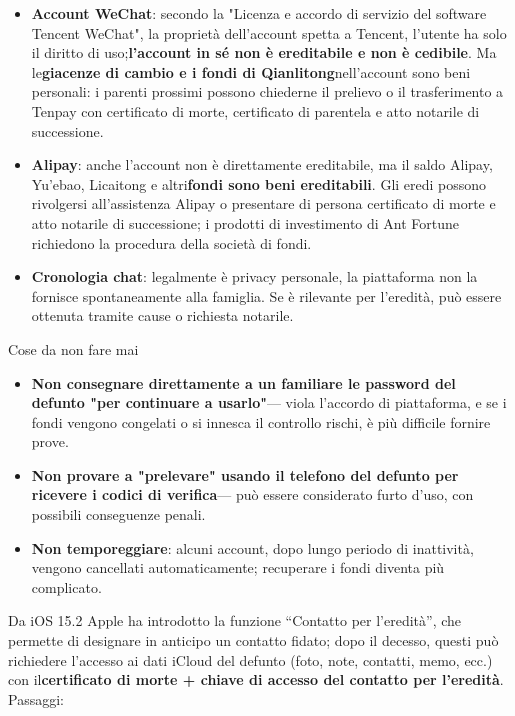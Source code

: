 \begin{itemize}
  \item \textbf{Account WeChat}: secondo la "Licenza e accordo di servizio del software Tencent WeChat", la proprietà dell'account spetta a Tencent, l'utente ha solo il diritto di uso;\textbf{l'account in sé non è ereditabile e non è cedibile}. Ma le\textbf{giacenze di cambio e i fondi di Qianlitong}nell'account sono beni personali: i parenti prossimi possono chiederne il prelievo o il trasferimento a Tenpay con certificato di morte, certificato di parentela e atto notarile di successione.
  \item \textbf{Alipay}: anche l'account non è direttamente ereditabile, ma il saldo Alipay, Yu'ebao, Licaitong e altri\textbf{fondi sono beni ereditabili}. Gli eredi possono rivolgersi all'assistenza Alipay o presentare di persona certificato di morte e atto notarile di successione; i prodotti di investimento di Ant Fortune richiedono la procedura della società di fondi.
  \item \textbf{Cronologia chat}: legalmente è privacy personale, la piattaforma non la fornisce spontaneamente alla famiglia. Se è rilevante per l'eredità, può essere ottenuta tramite cause o richiesta notarile.
\end{itemize}

\begin{tcbwarn}{Cose da non fare mai}
\begin{itemize}
  \item \textbf{Non consegnare direttamente a un familiare le password del defunto "per continuare a usarlo"}— viola l'accordo di piattaforma, e se i fondi vengono congelati o si innesca il controllo rischi, è più difficile fornire prove.
  \item \textbf{Non provare a "prelevare" usando il telefono del defunto per ricevere i codici di verifica}— può essere considerato furto d'uso, con possibili conseguenze penali.
  \item \textbf{Non temporeggiare}: alcuni account, dopo lungo periodo di inattività, vengono cancellati automaticamente; recuperare i fondi diventa più complicato.
\end{itemize}

\end{tcbwarn}


Da iOS 15.2 Apple ha introdotto la funzione “Contatto per l'eredità”, che permette di designare in anticipo un contatto fidato; dopo il decesso, questi può richiedere l'accesso ai dati iCloud del defunto (foto, note, contatti, memo, ecc.) con il\textbf{certificato di morte + chiave di accesso del contatto per l'eredità}. Passaggi:

